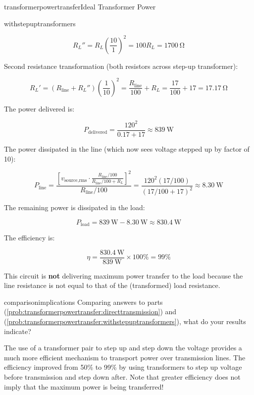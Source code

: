\begin{mainquestion}{transformerpowertransfer}{Ideal Transformer Power}
\begin{partquestion}{withstepuptransformers}
\begin{answer}
\[
R_L'' = R_L \left(\frac{10}{1}\right)^2 = 100 R_L = \qty{1700}{\ohm}
\]

Second resistance transformation (both resistors across step-up transformer):

\[
R_L' = \left(R_{\text{line}} + R_L''\right) \left(\frac{1}{10}\right)^2 = \frac{R_{\text{line}}}{100} + R_L = \frac{17}{100} + 17 = \qty{17.17}{\ohm}
\]

The power delivered is:

\[
P_{\text{delivered}} = \frac{120^2}{0.17 + 17} \approx \qty{839}{\watt}
\]

The power dissipated in the line (which now sees voltage stepped up by factor of 10):

\[
P_{\text{line}} = \frac{[v_{\text{source,rms}} \cdot \frac{R_{\text{line}}/100}{ R_{\text{line}}/100 + R_L}]^2}{R_{\text{line}}/100} = \frac{120^2(17/100)}{(17/100 + 17)^2} \approx \qty{8.30}{\watt}
\]

The remaining power is dissipated in the load:

\[
P_{\text{load}} = \qty{839}{\watt} - \qty{8.30}{\watt} \approx \qty{830.4}{\watt}
\]

The efficiency is:

\[
\eta = \frac{\qty{830.4}{\watt}}{\qty{839}{\watt}} \times 100\% = 99\%
\]

This circuit is \textbf{not} delivering maximum power transfer to the load because the line resistance is not equal to that of the (transformed) load
resistance.
\end{answer}
\end{partquestion}

\begin{partquestion}{comparisonimplications}
{Comparing answers to parts (\cref{prob:transformerpowertransfer:directtransmission}) and (\cref{prob:transformerpowertransfer:withstepuptransformers}), what do your results indicate?}

\begin{answer}
The use of a transformer pair to step up and step down the voltage provides a much more efficient mechanism to transport power over transmission lines. The efficiency improved from 50\% to 99\% by using transformers to step up voltage before transmission and step down after. Note that greater efficiency does not imply that the maximum power is being transferred!
\end{answer}
\end{partquestion}


\end{mainquestion}
